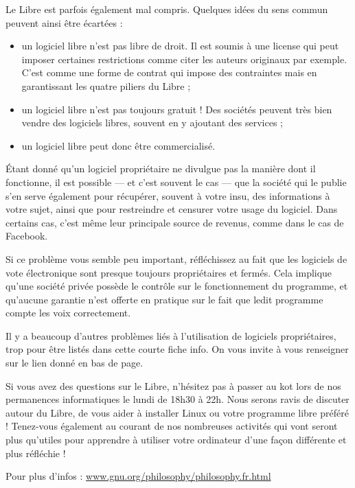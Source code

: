 \documentclass[11pt]{../fiche}
\begin{document}
Le Libre est parfois également mal compris. Quelques idées du sens commun peuvent ainsi être écartées :
\begin{itemize}
\item un logiciel libre n'est pas libre de droit. Il est soumis à une license qui peut imposer certaines restrictions comme citer les auteurs originaux par exemple. C'est comme une forme de contrat qui impose des contraintes mais en garantissant les quatre piliers du Libre ;
\item un logiciel libre n'est pas toujours gratuit ! Des sociétés peuvent très bien vendre des logiciels libres, souvent en y ajoutant des services ;
\item un logiciel libre peut donc être commercialisé.
\end{itemize}

\vspace{0.8em}

Étant donné qu'un logiciel propriétaire ne divulgue pas la manière dont il fonctionne, il est possible --- et c'est souvent le cas --- que la société qui le publie s'en serve également pour récupérer, souvent à votre insu, des informations à votre sujet, ainsi que pour restreindre et censurer votre usage du logiciel. Dans certains cas, c'est même leur principale source de revenus, comme dans le cas de Facebook.

Si ce problème vous semble peu important, réfléchissez au fait que les logiciels de vote électronique sont presque toujours propriétaires et fermés. Cela implique qu'une société privée possède le contrôle sur le fonctionnement du programme, et qu'aucune garantie n'est offerte en pratique sur le fait que ledit programme compte les voix correctement.

Il y a beaucoup d'autres problèmes liés à l'utilisation de logiciels propriétaires, trop pour être listés dans cette courte fiche info. On vous invite à vous renseigner sur le lien donné en bas de page.

\vspace{0.8em}

Si vous avez des questions sur le Libre, n'hésitez pas à passer au kot lors de nos permanences informatiques le lundi de 18h30 à 22h. Nous serons ravis de discuter autour du Libre, de vous aider à installer Linux ou votre programme libre préféré ! Tenez-vous également au courant de nos nombreuses activités qui vont seront plus qu'utiles pour apprendre à utiliser votre ordinateur d'une façon différente et plus réfléchie !
\vspace{0.8em}

Pour plus d'infos : \url{www.gnu.org/philosophy/philosophy.fr.html}
\end{document}
